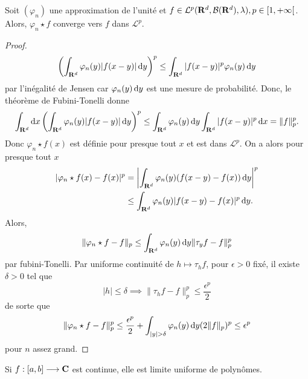 \begin{thm}
    Soit $(\varphi_n)$ une approximation de l'unité et  $f \in  \mathcal  L^p(\mathbf R^d, \mathcal  B(\mathbf R^d), \lambda), p \in  [1, +\infty[$. Alors, $\varphi_n\star f$ converge vers $f$ dans  $\mathcal  L^p$.
\end{thm}

\begin{proof}
    \[\left(\int_{\mathbf R^d} \varphi_n(y)|f(x-y)|\mathop{}\!\mathrm d y\right)^p \leq \int_{\mathbf R^d}|f(x-y)|^p\varphi_n(y)\mathop{}\!\mathrm d y\] par l'inégalité de Jensen car $ \varphi_n(y)\mathop{}\!\mathrm d y $ est une mesure de probabilité. Donc, le théorème de Fubini-Tonelli donne \[
    \int_{\mathbf R^d} \mathop{}\!\mathrm d x \left(\int_{\mathbf R^d}\varphi_n(y)|f(x-y)|\mathop{}\!\mathrm d y\right)^p\leq \int_{\mathbf R^d}\varphi_n(y)\mathop{}\!\mathrm d y\int_{\mathbf R^d}|f(x-y)|^p\mathop{}\!\mathrm d x=\|f\|_p^p.
\]
Donc $\varphi_n\star f(x)$ est définie pour presque tout  $x$ et est dans  $\mathcal  L^p$. On a alors pour presque tout $x$
 \begin{align*}
|\varphi_n\star f(x)-f(x)|^p &= \left| \int_{\mathbf R^d}\varphi_n(y)(f(x-y)-f(x))\mathop{}\!\mathrm d y \right|^p\\ &\leq \int_{\mathbf R^d} \varphi_n(y)|f(x-y)-f(x)|^p\mathop{}\!\mathrm d y.
\end{align*}
Alors, \[\|\varphi_n\star f-f\|_p\leq \int_{\mathbf R^d}\varphi_n(y)\mathop{}\!\mathrm d y\|\tau_yf-f\|_p^p\] par fubini-Tonelli. Par uniforme continuité de $h\mapsto \tau_hf$, pour $\epsilon>0$ fixé, il existe $\delta>0$ tel que  \[
|h|\leq \delta \implies \|\tau_hf-f\|_p^p\leq \frac{\epsilon^p}2
\] 
de sorte que \[\|\varphi_n\star f-f\|_p^p\leq \frac{\epsilon^p}2+\int_{|y|>\delta}\varphi_n(y)\diff y (2\|f\|_p)^p\leq \epsilon^p\] pour $n$ assez grand.
\end{proof}

\begin{cor}
    Si $f:[a, b]\longrightarrow \mathbf C$ est continue, elle est limite uniforme de polynômes.
\end{cor}

